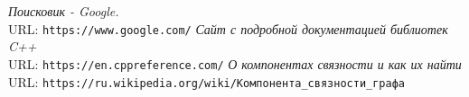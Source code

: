 \begin{thebibliography}{99}
{\itshape Поисковик - Google.} \\URL: \texttt{https://www.google.com/}
{\itshape Сайт с подробной документацией библиотек C++} \\URL: \texttt{https://en.cppreference.com/}
{\itshape О компонентах связности и как их найти} \\URL: \texttt{https://ru.wikipedia.org/wiki/Компонента\_связности\_графа}
\end{thebibliography}
\pagebreak
